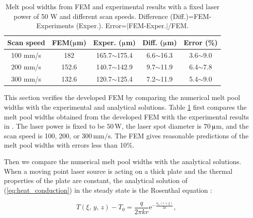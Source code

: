\documentclass [11pt, proquest] {uwthesis}[2020/02/24]
\begin{document}
\begin{table}[!ht]
\caption{\label{tab:Model-verification:-comparing}Melt pool widths from FEM
and experimental results with a fixed
laser power of 50 W and different scan speeds. Difference (Diff.)=FEM-Experiments
(Exper.). Error=$|$FEM-Exper.$|$/FEM.}

\centering{}\renewcommand{\arraystretch}{1}\begingroup\tabcolsep=1pt%
\begin{tabular*}{10cm}{@{\extracolsep{\fill}}ccccc}
\hline 
Scan speed & FEM($\muup$m) & Exper. ($\muup$m) & Diff. ($\muup$m) & Error (\%)\tabularnewline
\hline 
100 mm/s & 182 & 165.7$\sim$175.4 & 6.6$\sim$16.3 & 3.6$\sim$9.0\tabularnewline
200 mm/s & 152.6 & 140.7$\sim$142.9 & 9.7$\sim$11.9 & 6.4$\sim$7.8\tabularnewline
300 mm/s & 132.6 & 120.7$\sim$125.4 & 7.2$\sim$11.9 & 5.4$\sim$9.0\tabularnewline
\hline 
\end{tabular*}\endgroup
\end{table}
This section verifies the developed FEM by comparing the numerical
melt pool widths with the experimental and analytical solutions.
Table \ref{tab:Model-verification:-comparing} first compares the
melt pool widths obtained from the developed FEM with the experimental
results in \cite{yadroitsev2014selective}. The laser power is fixed
to be $50\,\text{W}$, the laser spot diameter is $70\,$$\muup$m,
and the scan speed is 100, 200, or $300\,\text{mm/s}$. The FEM gives
reasonable predictions of the melt pool widths with errors less than
10\%.

Then we compare the numerical melt pool widths with the analytical
solutions. When a moving point laser source is acting on a thick plate
and the thermal properties of the plate are constant, the analytical
solution of (\ref{eq:heat_conduction}) in the steady state is the
Rosenthal equation \cite{kannatey2009principles}:

\noindent 
\begin{equation}
T(\xi,\,y,\,z)-T_{0}=\frac{q}{2\pi kr}\text{e}^{-\frac{u_{x}(r+\xi)}{2\kappa}},\label{eq:Rosenthal}
\end{equation}
\end{document}
